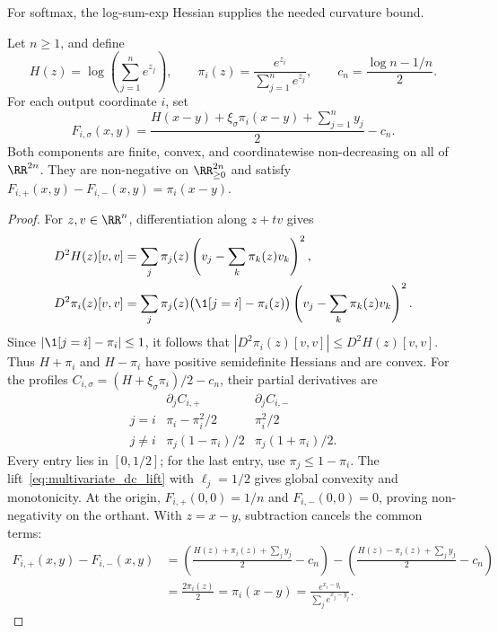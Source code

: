For softmax, the log-sum-exp Hessian supplies the needed curvature bound.

\begin{theoremenv}\label{thm:softmax_dc_split}
Let $n\ge1$, and define
\begin{equation*}
    H(z)=\log\!\left(\sum_{j=1}^n e^{z_j}\right),
    \qquad \pi_i(z)=\frac{e^{z_i}}{\sum_{j=1}^n e^{z_j}},
    \qquad c_n=\frac{\log n-1/n}{2}.
\end{equation*}
For each output coordinate $i$, set
\begin{equation}
    F_{i,\sigma}(x,y)
    =\frac{H(x-y)+\xi_\sigma\pi_i(x-y)+\sum_{j=1}^n y_j}{2}-c_n.
    \label{eq:softmax_dc_pair}
\end{equation}
Both components are finite, convex, and coordinatewise non-decreasing on all of $\RR^{2n}$. They are non-negative on $\RR^{2n}_{\ge0}$ and satisfy
$F_{i,+}(x,y)-F_{i,-}(x,y)=\pi_i(x-y)$.
\end{theoremenv}

\begin{proof}
For $z,v\in\RR^n$, differentiation along $z+tv$ gives
\begin{equation}
\begin{aligned}
    D^2H(z)[v,v]
    &=\sum_j\pi_j(z)\left(v_j-\sum_k\pi_k(z)v_k\right)^2,\\
    D^2\pi_i(z)[v,v]
    &=\sum_j\pi_j(z)\bigl(\1[j=i]-\pi_i(z)\bigr)
      \left(v_j-\sum_k\pi_k(z)v_k\right)^2.
\end{aligned}
    \label{eq:softmax_curvature_domination}
\end{equation}
Since $|\1[j=i]-\pi_i|\le1$, it follows that
$|D^2\pi_i(z)[v,v]|\le D^2H(z)[v,v]$. Thus $H+\pi_i$ and $H-\pi_i$ have positive semidefinite Hessians and are convex. For the profiles $C_{i,\sigma}=(H+\xi_\sigma\pi_i)/2-c_n$, their partial derivatives are
\begin{equation}
\begin{array}{c|cc}
 & \partial_j C_{i,+} & \partial_j C_{i,-}\\ \hline
 j=i & \pi_i-\pi_i^2/2 & \pi_i^2/2\\
 j\ne i & \pi_j(1-\pi_i)/2 & \pi_j(1+\pi_i)/2.
\end{array}
    \label{eq:softmax_profile_gradients}
\end{equation}
Every entry lies in $[0,1/2]$; for the last entry, use $\pi_j\le1-\pi_i$. The lift~\eqref{eq:multivariate_dc_lift} with $\ell_j=1/2$ gives global convexity and monotonicity. At the origin, $F_{i,+}(0,0)=1/n$ and $F_{i,-}(0,0)=0$, proving non-negativity on the orthant. With $z=x-y$, subtraction cancels the common terms:
\begin{align*}
F_{i,+}(x,y)-F_{i,-}(x,y)
&=\left(\frac{H(z)+\pi_i(z)+\sum_j y_j}{2}-c_n\right)
 -\left(\frac{H(z)-\pi_i(z)+\sum_j y_j}{2}-c_n\right)\\
&=\frac{2\pi_i(z)}{2}=\pi_i(x-y)
 =\frac{e^{x_i-y_i}}{\sum_j e^{x_j-y_j}}.
\end{align*}
\end{proof}

